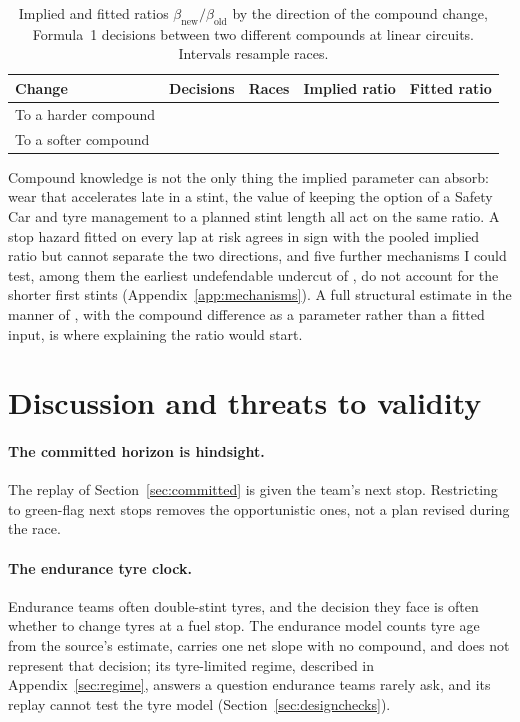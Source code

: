 \documentclass[11pt,a4paper]{article}
\begin{document}
\begin{table}[htbp]
\centering
\caption{Implied and fitted ratios $\beta_{\mathrm{new}}/\beta_{\mathrm{old}}$
by the direction of the compound change, Formula~1 decisions between two
different compounds at linear circuits. Intervals resample races.}
\label{tab:direction}
\begin{tabular}{lrrll}
\toprule
Change & Decisions & Races & Implied ratio & Fitted ratio \\
\midrule
To a harder compound & \ImpliedHarderN{} & \ImpliedHarderRaces{} & \ImpliedHarder{} \ImpliedHarderCi{} & \ImpliedFittedHarder{} \ImpliedFittedHarderCi{} \\
To a softer compound & \ImpliedSofterN{} & \ImpliedSofterRaces{} & \ImpliedSofter{} \ImpliedSofterCi{} & \ImpliedFittedSofter{} \ImpliedFittedSofterCi{} \\
\bottomrule
\end{tabular}
\end{table}

Compound knowledge is not the only thing the implied parameter can absorb:
wear that accelerates late in a stint, the value of keeping the option of a
Safety Car and tyre management to a planned stint length all act on the
same ratio. A stop hazard fitted on every lap at risk agrees in sign with the
pooled implied ratio but cannot separate the two directions, and five further mechanisms I could test, among them the
earliest undefendable undercut of \citet{salminen2026}, do not account for the
shorter first stints (Appendix~\ref{app:mechanisms}). A full structural estimate in the manner of
\citet{rust1987}, with the compound difference as a parameter rather than a
fitted input, is where explaining the ratio would start.

\section{Discussion and threats to validity}
\label{sec:threats}

\paragraph{The committed horizon is hindsight.} The replay of
Section~\ref{sec:committed} is given the team's next stop. Restricting to green-flag next stops removes the opportunistic ones,
not a plan revised during the race.

\paragraph{The endurance tyre clock.} Endurance teams often double-stint tyres,
and the decision they face is often whether to change tyres at a fuel stop. The
endurance model counts tyre age from the source's estimate, carries one net
slope with no compound, and does not represent that decision; its
tyre-limited regime, described in Appendix~\ref{sec:regime}, answers a question
endurance teams rarely ask, and its replay cannot test the tyre model
(Section~\ref{sec:designchecks}).
\end{document}
